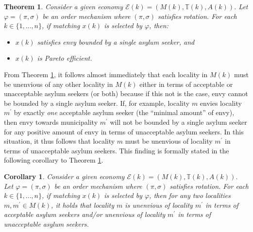 \documentclass[12pt,fleqn]{article}
\newtheorem{theorem}{Theorem}
\newtheorem{corollary}{Corollary}
\begin{document}
\begin{theorem}\rm\label{THEOREM:envy_efficiency}
Consider a given economy $\mathcal{E}(k)=(M(k),\mathbb{T}(k),A(k))$. Let $\varphi=(\pi,\sigma)$ be an order mechanism where $(\pi,\sigma)$ satisfies rotation.
For each $k\in \{1,\ldots,n\}$, if matching $x(k)$ is selected by $\varphi$, then:
\begin{itemize}
\item[(i)] $x(k)$ satisfies envy bounded by a single asylum seeker, and
\item[(ii)] $x(k)$ is Pareto efficient.
\end{itemize}
\end{theorem}
\noindent From Theorem \ref{THEOREM:envy_efficiency}, it follows almost immediately that each locality in $M(k)$ must be unenvious of any other locality in $M(k)$ either in terms of acceptable or unacceptable asylum seekers (or both) because if this not is the case, envy cannot be bounded by a single asylum seeker. If, for example, locality $m$ envies locality $m^\prime$ by exactly \emph{one} acceptable asylum seeker (the ``minimal amount'' of envy), then envy towards municipality $m^\prime$ will not be bounded by a single asylum seeker for any positive amount of envy in terms of unacceptable asylum seekers. In this situation, it thus follows that locality $m$ must be unenvious of locality $m^\prime$ in terms of unacceptable asylum seekers. This finding is formally stated in the following corollary to Theorem \ref{THEOREM:envy_efficiency}.
\begin{corollary}\rm\label{COROLLARY:envy}
Consider a given economy $\mathcal{E}(k)=(M(k),\mathbb{T}(k),A(k))$. Let $\varphi=(\pi,\sigma)$ be an order mechanism where $(\pi,\sigma)$ satisfies rotation.
For each $k\in \{1,\ldots,n\}$, if matching $x(k)$ is selected by $\varphi$, then for any two localities $m,m^\prime\in M(k)$, it holds that locality $m$ is unenvious of locality $m^\prime$ in terms of acceptable asylum seekers and/or unenvious of locality $m^\prime$ in terms of unacceptable asylum seekers.
\end{corollary}
\end{document}
